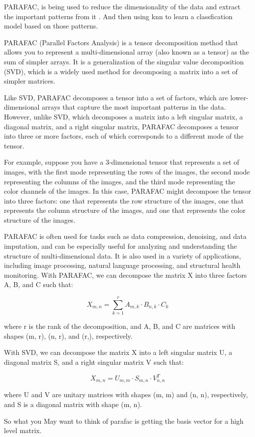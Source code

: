 \documentclass{article}
\theoremstyle{mytheoremstyle}
\theoremstyle{mytheoremstyle}
\theoremstyle{myproblemstyle}
\begin{document}
PARAFAC, is being used to reduce the dimensionality of the data and extract the important patterns from it . And then using knn to learn a classfication model based on those patterns.

\begin{definition}[PARAFAC]
	PARAFAC (Parallel Factors Analysis) is a tensor decomposition method that allows you to represent a multi-dimensional array (also known as a tensor) as the sum of simpler arrays. It is a generalization of the singular value decomposition (SVD), which is a widely used method for decomposing a matrix into a set of simpler matrices.

	Like SVD, PARAFAC decomposes a tensor into a set of factors, which are lower-dimensional arrays that capture the most important patterns in the data. However, unlike SVD, which decomposes a matrix into a left singular matrix, a diagonal matrix, and a right singular matrix, PARAFAC decomposes a tensor into three or more factors, each of which corresponds to a different mode of the tensor.

	For example, suppose you have a 3-dimensional tensor that represents a set of images, with the first mode representing the rows of the images, the second mode representing the columns of the images, and the third mode representing the color channels of the images. In this case, PARAFAC might decompose the tensor into three factors: one that represents the row structure of the images, one that represents the column structure of the images, and one that represents the color structure of the images.

	PARAFAC is often used for tasks such as data compression, denoising, and data imputation, and can be especially useful for analyzing and understanding the structure of multi-dimensional data. It is also used in a variety of applications, including image processing, natural language processing, and structural health monitoring.
	With PARAFAC, we can decompose the matrix X into three factors A, B, and C such that:

	$$X_{m,n} = \sum_{k=1}^r A_{m,k} \cdot B_{n,k} \cdot C_{k}$$

	where r is the rank of the decomposition, and A, B, and C are matrices with shapes (m, r), (n, r), and (r,), respectively.

	With SVD, we can decompose the matrix X into a left singular matrix U, a diagonal matrix S, and a right singular matrix V such that:

	$$X_{m,n} = U_{m,m} \cdot S_{m,n} \cdot V_{n,n}^T$$

	where U and V are unitary matrices with shapes (m, m) and (n, n), respectively, and S is a diagonal matrix with shape (m, n).

	So what you May want to think of parafac is getting the basis vector for a high level matrix.

\end{definition}
\end{document}
